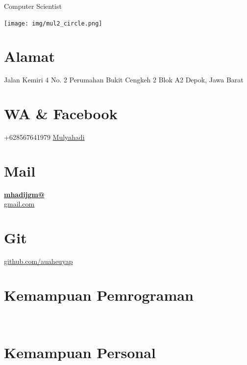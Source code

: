 \documentclass[]{friggeri-cv}
\begin{document}
      {Computer Scientist}
      

\begin{aside}
  \texttt{[image: img/mul2\_circle.png]}
  \section{Alamat}
	Jalan Kemiri 4 No. 2
	Perumahan Bukit Cengkeh 2 Blok A2 
    Depok, Jawa Barat
    ~
  \section{WA \& Facebook}
    +628567641979
    \href{https://www.facebook.com/mulyahadi.j}{Mulyahadi}
    ~
  \section{Mail}
    \href{mailto:mhaidjgm@gmail.com}{\textbf{mhadijgm@}\\gmail.com}
    ~
  \section{Git}
    \href{https://github.com/auaheuyap}{github.com/auaheuyap}
    ~
  \section{Kemampuan Pemrograman}
    ~
  \section{Kemampuan Personal}
    ~
\end{aside}
~
\end{document}
